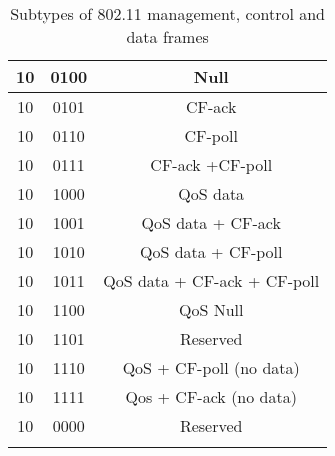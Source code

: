 \begin{center}
\begin{longtable}{|c|c|c|}
10 & 0100 & Null    \\  \hline
10 & 0101 & CF-ack     \\  \hline
10 & 0110 & CF-poll    \\  \hline
10 & 0111 & CF-ack +CF-poll     \\  \hline
10 & 1000 & QoS data    \\  \hline
10 & 1001 & QoS data + CF-ack    \\  \hline
10 &1010 & QoS data + CF-poll    \\  \hline
10 &1011 & QoS data + CF-ack + CF-poll    \\  \hline
10 &1100 & QoS Null    \\ \hline
10 &1101 & Reserved  \\  \hline
10 &1110 & QoS + CF-poll (no data)    \\ \hline
10 &1111 & Qos + CF-ack (no data)   \\ \hline
10 &0000 & Reserved    \\  \hline

\caption[802.11 frame subtypes]{Subtypes of 802.11 management, control and data frames}
\label{tab:frames_subtypes}
\end{longtable}
\end{center}
